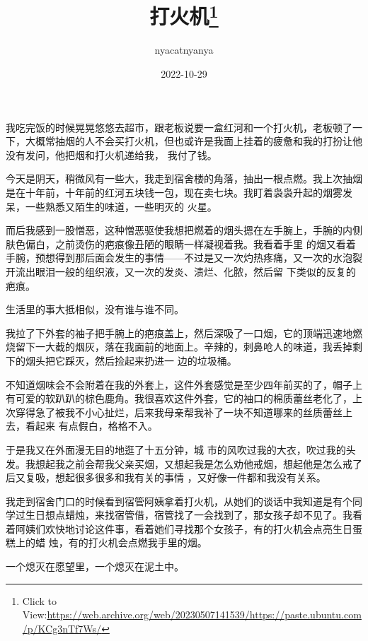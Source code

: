 \documentclass{article}
\title{打火机\footnote{Click to View:\url{https://web.archive.org/web/20230507141539/https://paste.ubuntu.com/p/KCg3nTf7Ws/}}}
\author{nyacatnyanya}
\date{2022-10-29}
\begin{document}

\maketitle


\Large

﻿我吃完饭的时候晃晃悠悠去超市，跟老板说要一盒红河和一个打火机，老板顿了一下，大概常抽烟的人不会买打火机，但也或许是我面上挂着的疲惫和我的打扮让他没有发问，他把烟和打火机递给我，
我付了钱。 

今天是阴天，稍微风有一些大，我走到宿舍楼的角落，抽出一根点燃。我上次抽烟是在十年前，十年前的红河五块钱一包，现在卖七块。我盯着袅袅升起的烟雾发呆，一些熟悉又陌生的味道，一些明灭的
火星。 

而后我感到一股憎恶，这种憎恶驱使我想把燃着的烟头摁在左手腕上，手腕的内侧肤色偏白，之前烫伤的疤痕像丑陋的眼睛一样凝视着我。我看着手里
\newpage
的烟又看着手腕，预想得到那后面会发生的事情——不过是又一次灼热疼痛，又一次的水泡裂开流出眼泪一般的组织液，又一次的发炎、溃烂、化脓，然后留
下类似的反复的疤痕。 


生活里的事大抵相似，没有谁与谁不同。 

我拉了下外套的袖子把手腕上的疤痕盖上，然后深吸了一口烟，它的顶端迅速地燃烧留下一大截的烟灰，落在我面前的地面上。辛辣的，刺鼻呛人的味道，我丢掉剩下的烟头把它踩灭，然后捡起来扔进一
边的垃圾桶。 

不知道烟味会不会附着在我的外套上，这件外套感觉是至少四年前买的了，帽子上有可爱的软趴趴的棕色鹿角。我很喜欢这件外套，它的袖口的棉质蕾丝老化了，上次穿得急了被我不小心扯烂，后来我母亲帮我补了一块不知道哪来的丝质蕾丝上去，看起来
有点假白，格格不入。 

于是我又在外面漫无目的地逛了十五分钟，城
\newpage
市的风吹过我的大衣，吹过我的头发。我想起我之前会帮我父亲买烟，又想起我是怎么劝他戒烟，想起他是怎么戒了后又复吸，想起很多很多和我有关的事情
，又好像一件都和我没有关系。 

我走到宿舍门口的时候看到宿管阿姨拿着打火机，从她们的谈话中我知道是有个同学过生日想点蜡烛，来找宿管借，宿管找了一会找到了，那女孩子却不见了。我看着阿姨们欢快地讨论这件事，看着她们寻找那个女孩子，有的打火机会点亮生日蛋糕上的蜡
烛，有的打火机会点燃我手里的烟。 

一个熄灭在愿望里，一个熄灭在泥土中。
\end{document}
